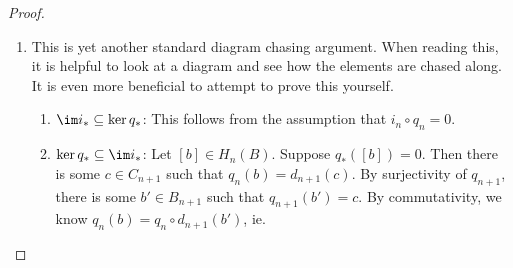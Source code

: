 \documentclass[a4paper]{article}
\theoremstyle{definition}
\begin{document}
\begin{proof}
\begin{enumerate}
\begin{enumerate}
\begin{align*}
            &= i_{n - 1} \circ d_n (a) + d_n(y).
          \end{align*}
          Hence when we pull back $d_n(y')$ and $d_n(y)$ to $A_{n - 1}$, the results differ by the boundary $d_n(a)$, and hence produce the same homology class.
        \item Suppose $[x'] = [x]$. We want to show that $\partial_* [x] = \partial_*[x']$. This time, we add a layer above.
          \[
            \begin{tikzcd}
              0 \ar[r] & A_{n + 1} \ar[r, "i_{n + 1}"] \ar[d, "d_{n + 1}"] & B_{n + 1} \ar[r, "q_{n + 1}"] \ar[d, "d_{n + 1}"] & C_{n + 1} \ar[r] \ar[d, "d_{n + 1}"] & 0\\
              0 \ar[r] & A_n \ar[r, "i_n"] \ar[d, "d_n"] & B_n \ar[r, "q_n"] \ar[d, "d_n"] & C_n \ar[r] \ar[d, "d_n"] & 0\\
              0 \ar[r] & A_{n - 1} \ar[r, "i_{n - 1}"] & B_{n - 1} \ar[r, "q_{n - 1}"] & C_{n - 1} \ar[r] & 0
            \end{tikzcd}
          \]
          By definition, since $[x'] = [x]$, there is some $c \in C_{n + 1}$ such that
          \[
            x' = x + d_{n + 1} (c).
          \]
          By surjectivity of $q_{n + 1}$, we can write $c = q_{n + 1}(b)$ for some $b \in B_{n + 1}$. By commutativity of the squares, we know
          \[
            x' = x + q_n \circ d_{n + 1} (b).
          \]
          The next step of the proof is to find some $y$ such that $q_n (y) = x$. Then
          \[
            q_n(y + d_{n + 1} (b)) = x'.
          \]
          So the corresponding $y'$ is $y' = y + d_{n + 1}(b)$. So $d_n (y) = d_n(y')$, and hence $\partial_*[x] = \partial_* [x']$.
      \end{enumerate}
    \item This is yet another standard diagram chasing argument. When reading this, it is helpful to look at a diagram and see how the elements are chased along. It is even more beneficial to attempt to prove this yourself.
      \begin{enumerate}
        \item $\im i_* \subseteq \ker q_*$: This follows from the assumption that $i_n \circ q_n = 0$.
        \item $\ker q_* \subseteq \im i_*$: Let $[b] \in H_n(B)$. Suppose $q_*([b]) = 0$. Then there is some $c \in C_{n + 1}$ such that $q_n(b) = d_{n + 1}(c)$. By surjectivity of $q_{n + 1}$, there is some $b' \in B_{n + 1}$ such that $q_{n + 1}(b') = c$. By commutativity, we know $q_n(b) = q_n \circ d_{n + 1}(b')$, ie.

\end{enumerate}
\end{enumerate}
\end{proof}
\end{document}
